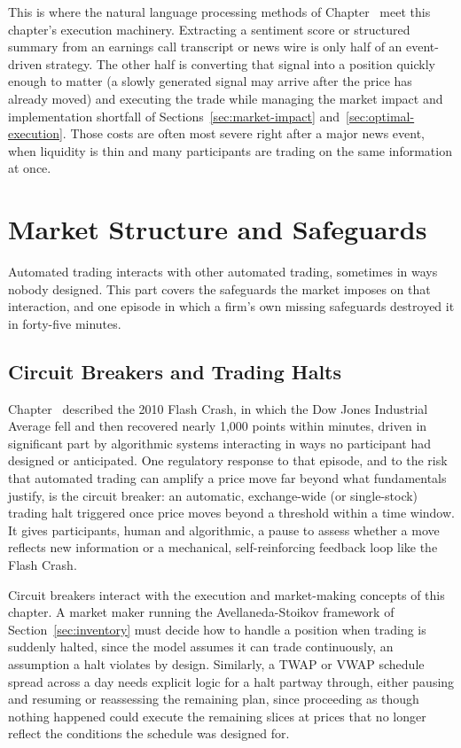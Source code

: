 \documentclass[../ai_in_finance]{subfiles}
\begin{document}
This is where the natural language processing methods of Chapter~ meet this chapter's execution machinery. Extracting a sentiment score or structured summary from an earnings call transcript or news wire is only half of an event-driven strategy. The other half is converting that signal into a position quickly enough to matter (a slowly generated signal may arrive after the price has already moved) and executing the trade while managing the market impact and implementation shortfall of Sections~\ref{sec:market-impact} and~\ref{sec:optimal-execution}. Those costs are often most severe right after a major news event, when liquidity is thin and many participants are trading on the same information at once.

\section{Market Structure and Safeguards}

Automated trading interacts with other automated trading, sometimes in ways nobody designed. This part covers the safeguards the market imposes on that interaction, and one episode in which a firm's own missing safeguards destroyed it in forty-five minutes.

\subsection{Circuit Breakers and Trading Halts}

Chapter~ described the 2010 Flash Crash, in which the Dow Jones Industrial Average fell and then recovered nearly 1,000 points within minutes, driven in significant part by algorithmic systems interacting in ways no participant had designed or anticipated. One regulatory response to that episode, and to the risk that automated trading can amplify a price move far beyond what fundamentals justify, is the circuit breaker: an automatic, exchange-wide (or single-stock) trading halt triggered once price moves beyond a threshold within a time window. It gives participants, human and algorithmic, a pause to assess whether a move reflects new information or a mechanical, self-reinforcing feedback loop like the Flash Crash.

Circuit breakers interact with the execution and market-making concepts of this chapter. A market maker running the Avellaneda-Stoikov framework of Section~\ref{sec:inventory} must decide how to handle a position when trading is suddenly halted, since the model assumes it can trade continuously, an assumption a halt violates by design. Similarly, a TWAP or VWAP schedule spread across a day needs explicit logic for a halt partway through, either pausing and resuming or reassessing the remaining plan, since proceeding as though nothing happened could execute the remaining slices at prices that no longer reflect the conditions the schedule was designed for.
\end{document}
